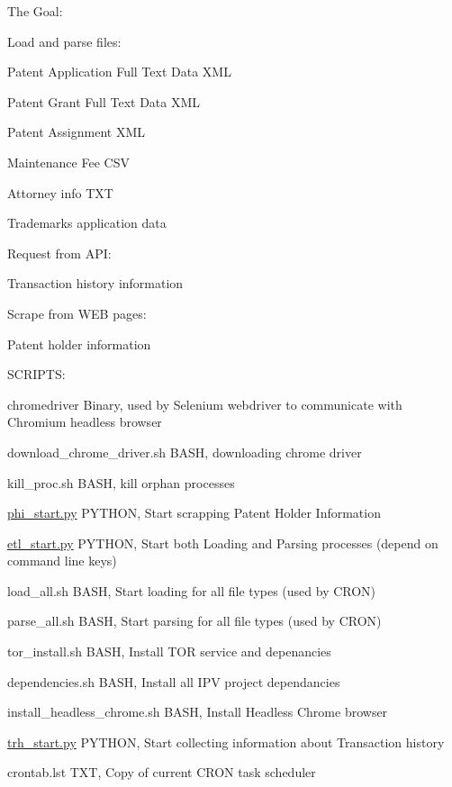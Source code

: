 The Goal\+:

Load and parse files\+:
\begin{DoxyItemize}
\item Patent Application Full Text Data X\+ML
\item Patent Grant Full Text Data X\+ML
\item Patent Assignment X\+ML
\item Maintenance Fee C\+SV
\item Attorney info T\+XT
\item Trademarks application data
\end{DoxyItemize}

Request from A\+PI\+:
\begin{DoxyItemize}
\item Transaction history information
\end{DoxyItemize}

Scrape from W\+EB pages\+:
\begin{DoxyItemize}
\item Patent holder information
\end{DoxyItemize}

S\+C\+R\+I\+P\+TS\+:
\begin{DoxyItemize}
\item chromedriver Binary, used by Selenium webdriver to communicate with Chromium headless browser
\item download\+\_\+chrome\+\_\+driver.\+sh B\+A\+SH, downloading chrome driver
\item kill\+\_\+proc.\+sh B\+A\+SH, kill orphan processes
\item \mbox{\hyperlink{phi__start_8py}{phi\+\_\+start.\+py}} P\+Y\+T\+H\+ON, Start scrapping Patent Holder Information
\item \mbox{\hyperlink{etl__start_8py}{etl\+\_\+start.\+py}} P\+Y\+T\+H\+ON, Start both Loading and Parsing processes (depend on command line keys)
\item load\+\_\+all.\+sh B\+A\+SH, Start loading for all file types (used by C\+R\+ON)
\item parse\+\_\+all.\+sh B\+A\+SH, Start parsing for all file types (used by C\+R\+ON)
\item tor\+\_\+install.\+sh B\+A\+SH, Install T\+OR service and depenancies
\item dependencies.\+sh B\+A\+SH, Install all I\+PV project dependancies
\item install\+\_\+headless\+\_\+chrome.\+sh B\+A\+SH, Install Headless Chrome browser
\item \mbox{\hyperlink{trh__start_8py}{trh\+\_\+start.\+py}} P\+Y\+T\+H\+ON, Start collecting information about Transaction history
\item crontab.\+lst T\+XT, Copy of current C\+R\+ON task scheduler
\end{DoxyItemize}

